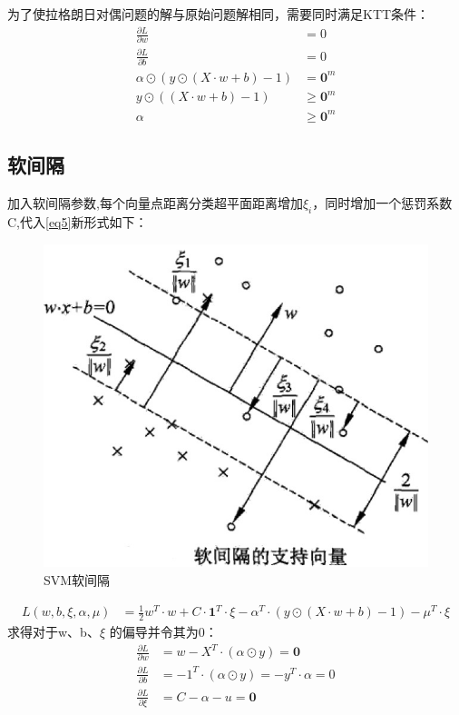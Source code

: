\documentclass[12pt, a4paper, oneside]{ctexart}
\begin{document}
为了使拉格朗日对偶问题的解与原始问题解相同，需要同时满足KTT条件：
\begin{align}
    \frac{\partial L}{\partial w} &= 0 \nonumber \\
    \frac{\partial L}{\partial b} &= 0 \nonumber \\
    {\alpha} \odot  (y \odot (X \cdot w + b) - 1) &= \boldsymbol{0}^m \nonumber \\
    y \odot ((X \cdot w + b) - 1) &\geq \boldsymbol{0}^m \nonumber \\
    {\alpha} &\geq \boldsymbol{0}^m  \nonumber 
\end{align}

\subsection{软间隔}
加入软间隔参数,每个向量点距离分类超平面距离增加$\xi_i$，同时增加一个惩罚系数C,代入\eqref{eq5}新形式如下：
\begin{figure}[htbp]
    \centering
    \includegraphics[width=14cm]{svm_soft.jpg}
    \caption{SVM软间隔}\label{fig2}
\end{figure}
\begin{align}
    L(w, b, \xi, {\alpha}, \mu ) &= \frac{1}{2}w^T \cdot w + C \cdot {\boldsymbol{1}^T} \cdot \xi  - {\alpha} ^T \cdot  (y \odot (X \cdot w + b) - 1) - \mu^T \cdot \xi  \label{eq9} 
\end{align}
求得对于w、b、$\xi$ 的偏导并令其为0：
\begin{align}
    \frac{\partial L}{\partial w} &= w - X^T\cdot(\alpha \odot y) = \boldsymbol{0} \nonumber \\
    \frac{\partial L}{\partial b} &= - 1^T\cdot(\alpha \odot y) = - y^T \cdot \alpha = 0  \nonumber \\
    \frac{\partial L}{\partial \xi} &= C - \alpha - u  = \boldsymbol{0} \nonumber 
\end{align}
\end{document}
